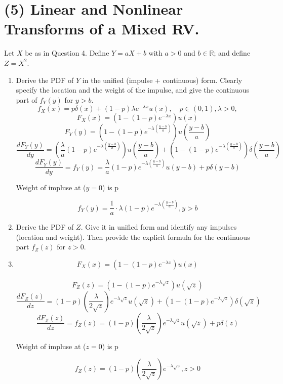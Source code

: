 \documentclass[12pt]{article}
\newenvironment{bluetext}{\color{blue}}{}
\begin{document}
\newpage

\section*{(5) Linear and Nonlinear Transforms of a Mixed RV.}

Let $X$ be as in Question 4. Define $Y=aX+b$ with $a>0$ and $b\in\mathbb{R}$; and define $Z=X^{2}$.
\begin{enumerate}
    \item[(a)] Derive the PDF of $Y$ in the unified (impulse + continuous) form. Clearly specify the location and the weight of the impulse, and give the continuous part of $f_{Y}(y)$ for $y>b$.
\begin{bluetext}
\[
f_X(x) = p\delta(x) + (1-p)\lambda e^{-\lambda x}u(x), \quad p \in (0, 1), \lambda > 0,
\]
\[F_X(x)=\left(1-(1-p)e^{-\lambda x}\right)u(x)\]
\[F_Y(y)=\left(1-(1-p)e^{-\lambda \left(\frac{y-b}{a}\right)}\right)u\left(\frac{y-b}{a}\right)\]
\[\frac{dF_Y(y)}{dy}=\left(\frac{\lambda}{a}(1-p)e^{-\lambda \left(\frac{y-b}{a}\right)}\right)u\left(\frac{y-b}{a}\right)+\left(1-(1-p)e^{-\lambda \left(\frac{y-b}{a}\right)}\right)\delta\left(\frac{y-b}{a}\right)\]
\[\frac{dF_Y(y)}{dy}=f_Y(y)=\frac{\lambda}{a}(1-p)e^{-\lambda \left(\frac{y-b}{a}\right)}u(y-b)+p\delta(y-b)\]
\begin{center}
            Weight of impluse at ($y = 0$) is p
\end{center}
\[
f_Y(y) = \frac{1}{a}\cdot\lambda(1-p)e^{-\lambda \left(\frac{y-b}{a}\right)} , y>b
\]  
\end{bluetext}
    
    \item[(b)] Derive the PDF of $Z$. Give it in unified form and identify any impulses (location and weight). Then provide the explicit formula for the continuous part $f_{Z}(z)$ for $z>0$.
    \item[] \begin{bluetext}
        \[F_X(x)=\left(1-(1-p)e^{-\lambda x}\right)u(x)\]\
        \[F_Z(z)=\left(1-(1-p)e^{-\lambda \sqrt{z}}\right)u(\sqrt{z})\]
        \[\frac{dF_Z(z)}{dz}=(1-p)\left(\frac{\lambda}{2\sqrt{z}}\right)e^{-\lambda \sqrt{z}}u(\sqrt{z})+\left(1-(1-p)e^{-\lambda \sqrt{z}}\right)\delta(\sqrt{z})\]
        \[\frac{dF_Z(z)}{dz}=f_Z(z)=(1-p)\left(\frac{\lambda}{2\sqrt{z}}\right)e^{-\lambda \sqrt{z}}u(\sqrt{z})+p\delta(z)\]
        \begin{center}
            Weight of impluse at ($z = 0$) is p
        \end{center}
        \[f_Z(z)=(1-p)\left(\frac{\lambda}{2\sqrt{z}}\right)e^{-\lambda \sqrt{z}}, z>0\]
    \end{bluetext}
\end{enumerate}
\end{document}
